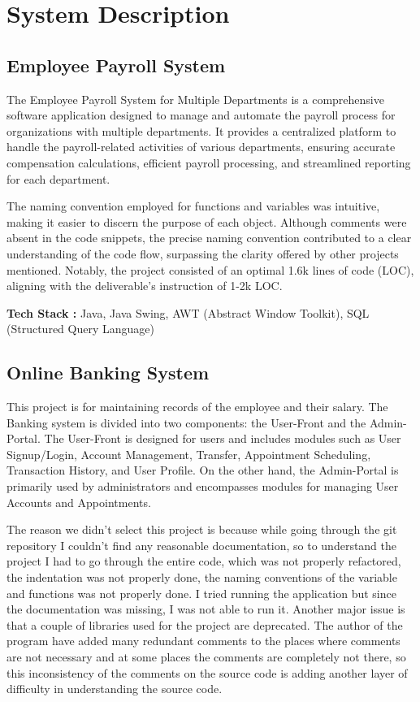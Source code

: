 \documentclass[12pt,english]{article}
\begin{document}
\section{System Description}
    \subsection{Employee Payroll System}
    The Employee Payroll System for Multiple Departments is a comprehensive software application designed to manage and automate the payroll process for organizations with multiple departments. It provides a centralized platform to handle the payroll-related activities of various departments, ensuring accurate compensation calculations, efficient payroll processing, and streamlined reporting for each department.

    The naming convention employed for functions and variables was intuitive, making it easier to discern the purpose of each object. Although comments were absent in the code snippets, the precise naming convention contributed to a clear understanding of the code flow, surpassing the clarity offered by other projects mentioned. Notably, the project consisted of an optimal 1.6k lines of code (LOC), aligning with the deliverable's instruction of 1-2k LOC.

    \vspace{0.5cm}
    
    \textbf{Tech Stack : } Java, Java Swing, AWT (Abstract Window Toolkit), SQL (Structured Query Language) 
    
    \subsection{Online Banking System}
    This project is for maintaining records of the employee and their salary. The Banking system is divided into two components: the User-Front and the Admin-Portal. The User-Front is designed for users and includes modules such as User Signup/Login, Account Management, Transfer, Appointment Scheduling, Transaction History, and User Profile. On the other hand, the Admin-Portal is primarily used by administrators and encompasses modules for managing User Accounts and Appointments.

    The reason we didn't select this project is because while going through the git repository I couldn't find any reasonable documentation, so to understand the project I had to go through the entire code, which was not properly refactored, the indentation was not properly done, the naming conventions of the variable and functions was not properly done. I tried running the application but since the documentation was missing, I was not able to run it. Another major issue is that a couple of libraries used for the project are deprecated. The author of the program have added many redundant comments to the places where comments are not necessary and at some places the comments are completely not there, so this inconsistency of the comments on the source code is adding another layer of difficulty in understanding the source code.
    
\end{document}
